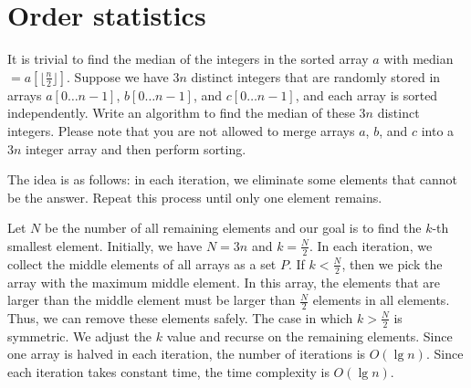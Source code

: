\section{Order statistics}
\begin{Exercise}[origin={NTUST CSIE 98},difficulty=1]
It is trivial to find the median of the integers in the sorted array $a$ with median $= a[\lfloor \frac{n}{2} \rfloor]$. Suppose we have $3n$ distinct integers that are randomly stored in arrays $a[0 \dots n-1]$, $b[0 \dots n-1]$, and $c[0 \dots n-1]$, and each array is sorted independently. Write an algorithm to find the median of these $3n$ distinct integers. Please note that you are not allowed to merge arrays $a$, $b$, and $c$ into a $3n$ integer array and then perform sorting. 
\end{Exercise}
\begin{Answer}
The idea is as follows:  in each iteration, we eliminate some elements that cannot be the answer. Repeat this process until only one element remains.

Let $N$ be the number of all remaining elements and our goal is to find the $k$-th smallest element. Initially, we have $N = 3n$ and $k = \frac{N}{2}$. In each iteration, we collect the middle elements of all arrays as a set $P$. If $k < \frac{N}{2}$, then we pick the array with the maximum middle element. In this array, the elements that are larger than the middle element must be larger than $\frac{N}{2}$ elements in all elements. Thus, we can remove these elements safely. The case in which $k > \frac{N}{2}$ is symmetric. We adjust the $k$ value and recurse on the remaining elements. Since one array is halved in each iteration, the number of iterations is $O(\lg n)$. Since each iteration takes constant time, the time complexity is $O(\lg n)$.
\end{Answer}

